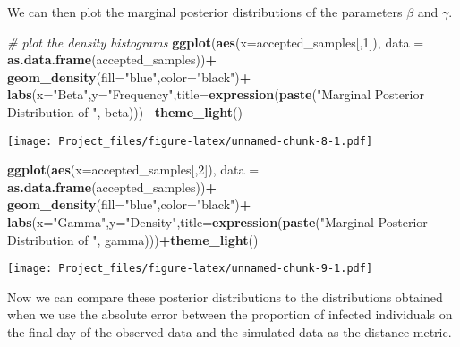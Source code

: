 \documentclass[
]{article}
\newenvironment{Shaded}{\begin{snugshade}}{\end{snugshade}}
\newcommand{\AttributeTok}[1]{\textcolor[rgb]{0.13,0.29,0.53}{#1}}
\newcommand{\CommentTok}[1]{\textcolor[rgb]{0.56,0.35,0.01}{\textit{#1}}}
\newcommand{\DecValTok}[1]{\textcolor[rgb]{0.00,0.00,0.81}{#1}}
\newcommand{\FunctionTok}[1]{\textcolor[rgb]{0.13,0.29,0.53}{\textbf{#1}}}
\newcommand{\NormalTok}[1]{#1}
\newcommand{\SpecialCharTok}[1]{\textcolor[rgb]{0.81,0.36,0.00}{\textbf{#1}}}
\newcommand{\StringTok}[1]{\textcolor[rgb]{0.31,0.60,0.02}{#1}}
\begin{document}
We can then plot the marginal posterior distributions of the parameters
\(\beta\) and \(\gamma\).

\begin{Shaded}
\begin{Highlighting}[]
\CommentTok{\# plot the density histograms}
\FunctionTok{ggplot}\NormalTok{(}\FunctionTok{aes}\NormalTok{(}\AttributeTok{x=}\NormalTok{accepted\_samples[,}\DecValTok{1}\NormalTok{]), }\AttributeTok{data =} \FunctionTok{as.data.frame}\NormalTok{(accepted\_samples))}\SpecialCharTok{+}
  \FunctionTok{geom\_density}\NormalTok{(}\AttributeTok{fill=}\StringTok{"blue"}\NormalTok{,}\AttributeTok{color=}\StringTok{"black"}\NormalTok{)}\SpecialCharTok{+}
  \FunctionTok{labs}\NormalTok{(}\AttributeTok{x=}\StringTok{"Beta"}\NormalTok{,}\AttributeTok{y=}\StringTok{"Frequency"}\NormalTok{,}\AttributeTok{title=}\FunctionTok{expression}\NormalTok{(}\FunctionTok{paste}\NormalTok{(}\StringTok{"Marginal Posterior Distribution of "}\NormalTok{, beta)))}\SpecialCharTok{+}\FunctionTok{theme\_light}\NormalTok{()}
\end{Highlighting}
\end{Shaded}

\texttt{[image: Project\_files/figure-latex/unnamed-chunk-8-1.pdf]}

\begin{Shaded}
\begin{Highlighting}[]
\FunctionTok{ggplot}\NormalTok{(}\FunctionTok{aes}\NormalTok{(}\AttributeTok{x=}\NormalTok{accepted\_samples[,}\DecValTok{2}\NormalTok{]), }\AttributeTok{data =} \FunctionTok{as.data.frame}\NormalTok{(accepted\_samples))}\SpecialCharTok{+}
  \FunctionTok{geom\_density}\NormalTok{(}\AttributeTok{fill=}\StringTok{"blue"}\NormalTok{,}\AttributeTok{color=}\StringTok{"black"}\NormalTok{)}\SpecialCharTok{+}
  \FunctionTok{labs}\NormalTok{(}\AttributeTok{x=}\StringTok{"Gamma"}\NormalTok{,}\AttributeTok{y=}\StringTok{"Density"}\NormalTok{,}\AttributeTok{title=}\FunctionTok{expression}\NormalTok{(}\FunctionTok{paste}\NormalTok{(}\StringTok{"Marginal Posterior Distribution of "}\NormalTok{, gamma)))}\SpecialCharTok{+}\FunctionTok{theme\_light}\NormalTok{()}
\end{Highlighting}
\end{Shaded}

\texttt{[image: Project\_files/figure-latex/unnamed-chunk-9-1.pdf]}

Now we can compare these posterior distributions to the distributions
obtained when we use the absolute error between the proportion of
infected individuals on the final day of the observed data and the
simulated data as the distance metric.
\end{document}
